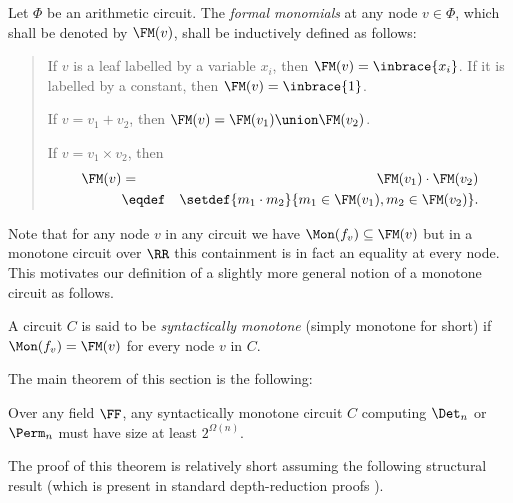 \begin{definition}
  Let $\Phi$ be an arithmetic circuit. 
The \emph{formal monomials} at any node $v\in \Phi$, which shall be denoted by $\FM(v)$, shall be inductively defined as follows:
  \begin{quote}
    If $v$ is a leaf labelled by a variable $x_i$, then $\FM(v) = \inbrace{x_i}$. 
If it is labelled by a constant, then $\FM(v) = \inbrace{1}$.
    
    If $v = v_1 + v_2$, then $\FM(v) = \FM(v_1) \union \FM(v_2)$. 
    
    If $v = v_1 \times v_2$, then 
    \begin{eqnarray*}
      \FM(v) &=& \FM(v_1)\cdot \FM(v_2)\\
      &\eqdef& \setdef{m_1\cdot m_2}{m_1 \in \FM(v_1), m_2\in \FM(v_2)}.
    \end{eqnarray*}
  \end{quote}
\end{definition}

\noindent Note that for any node $v$ in any circuit we have $\Mon(f_{v}) \subseteq \FM(v)$ but in a monotone circuit over $\RR$ this containment is in fact an equality at every node. 
This motivates our definition of a slightly more general notion of a monotone circuit as follows.

	
\begin{definition}
  A circuit $C$ is said to be \emph{syntactically monotone} (simply monotone for short) if $\Mon(f_{v}) = \FM(v)$ for every node $v$ in $C$.
\end{definition}
	
	
	
The main theorem of this section is the following: 

\begin{theorem}[\cite{js82}]\label{thm:monotone-circuit-lbs}
  Over any field $\FF$, any syntactically monotone circuit $C$ computing $\Det_n$ or $\Perm_n$ must have size at least $2^{\Omega(n)}$.
\end{theorem}

The proof of this theorem is relatively short assuming the following structural result (which is present in standard depth-reduction proofs \cite{vsbr83,ajmv98}).

